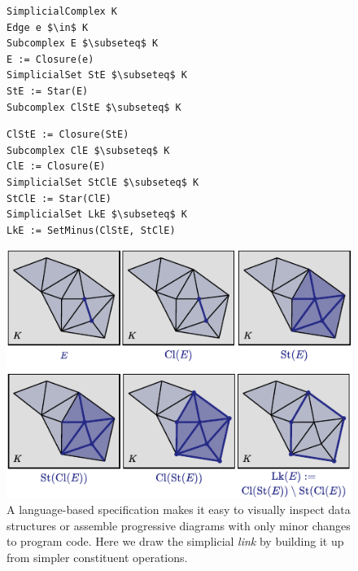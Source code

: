 \begin{figure}
\begin{mdframed}[style=SUBCode]
\begin{minipage}[t]{.47\columnwidth}
\begin{lstlisting}[language=Sub-mesh,escapechar=@,numbers=none]
SimplicialComplex K
Edge e $\in$ K
Subcomplex E $\subseteq$ K
E := Closure(e)
SimplicialSet StE $\subseteq$ K
StE := Star(E)
Subcomplex ClStE $\subseteq$ K
\end{lstlisting}
\end{minipage}
\ContinueLineNumber
\begin{minipage}[t]{.5\columnwidth}
\begin{lstlisting}[language=Sub-mesh,escapechar=@,numbers=none]
ClStE := Closure(StE)
Subcomplex ClE $\subseteq$ K
ClE := Closure(E)
SimplicialSet StClE $\subseteq$ K
StClE := Star(ClE)
SimplicialSet LkE $\subseteq$ K
LkE := SetMinus(ClStE, StClE)\end{lstlisting}
\end{minipage}
\end{mdframed}
   \centering
   \includegraphics[scale=1.5]{assets/penrose/mesh-figure.pdf}
   \caption{A language-based specification makes it easy to visually inspect data structures or assemble progressive diagrams with only minor changes to program code.  Here we draw the simplicial \emph{link} by building it up from simpler constituent operations.\label{fig:substance-mesh-clst}}
\end{figure}

